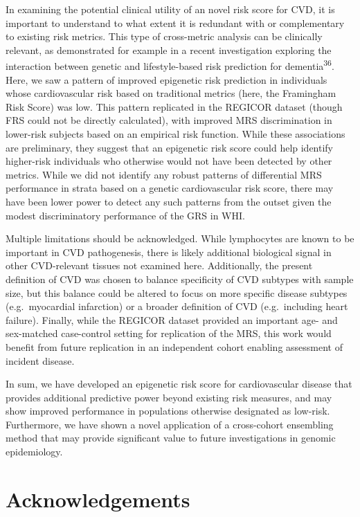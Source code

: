 \documentclass[]{article}
\begin{document}
In examining the potential clinical utility of an novel risk score for
CVD, it is important to understand to what extent it is redundant with
or complementary to existing risk metrics. This type of cross-metric
analysis can be clinically relevant, as demonstrated for example in a
recent investigation exploring the interaction between genetic and
lifestyle-based risk prediction for dementia\textsuperscript{36}. Here,
we saw a pattern of improved epigenetic risk prediction in individuals
whose cardiovascular risk based on traditional metrics (here, the
Framingham Risk Score) was low. This pattern replicated in the REGICOR
dataset (though FRS could not be directly calculated), with improved MRS
discrimination in lower-risk subjects based on an empirical risk
function. While these associations are preliminary, they suggest that an
epigenetic risk score could help identify higher-risk individuals who
otherwise would not have been detected by other metrics. While we did
not identify any robust patterns of differential MRS performance in
strata based on a genetic cardiovascular risk score, there may have been
lower power to detect any such patterns from the outset given the modest
discriminatory performance of the GRS in WHI.

Multiple limitations should be acknowledged. While lymphocytes are known
to be important in CVD pathogenesis, there is likely additional
biological signal in other CVD-relevant tissues not examined here.
Additionally, the present definition of CVD was chosen to balance
specificity of CVD subtypes with sample size, but this balance could be
altered to focus on more specific disease subtypes (e.g.~myocardial
infarction) or a broader definition of CVD (e.g.~including heart
failure). Finally, while the REGICOR dataset provided an important age-
and sex-matched case-control setting for replication of the MRS, this
work would benefit from future replication in an independent cohort
enabling assessment of incident disease.

In sum, we have developed an epigenetic risk score for cardiovascular
disease that provides additional predictive power beyond existing risk
measures, and may show improved performance in populations otherwise
designated as low-risk. Furthermore, we have shown a novel application
of a cross-cohort ensembling method that may provide significant value
to future investigations in genomic epidemiology.

\hypertarget{acknowledgements}{%
\section{Acknowledgements}\label{acknowledgements}}
\end{document}
